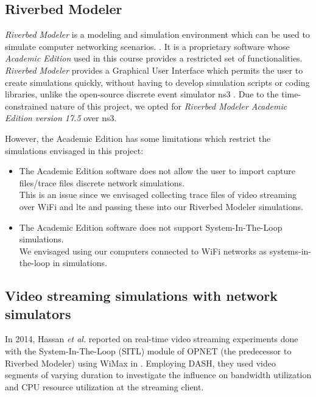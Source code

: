 \subsection{Riverbed Modeler} \label{subsec:background:riverbed}
\textit{Riverbed Modeler} is a modeling and simulation environment which can be used to simulate computer networking scenarios. \cite{riverbed}. It is a proprietary software whose \textit{Academic Edition} used in this course provides a restricted set of functionalities. \textit{Riverbed Modeler} provides a Graphical User Interface which permits the user to create simulations quickly, without having to develop simulation scripts or coding libraries, unlike the open-source discrete event simulator \gls{ns3} \cite{nsnamwiki}. Due to the time-constrained nature of this project, we opted for \textit{Riverbed Modeler Academic Edition version 17.5} over \gls{ns3}.

However, the Academic Edition has some limitations \cite{riverbedrestrictions} which restrict the simulations envisaged in this project:
\begin{itemize}
	\item The Academic Edition software does not allow the user to import capture files/trace files discrete network simulations.\\ This is an issue since we envisaged collecting trace files of video streaming over \gls{WiFi} and \gls{lte} and passing these into our Riverbed Modeler simulations.
	\item The Academic Edition software does not support System-In-The-Loop simulations.\\
	We envisaged using our computers connected to \gls{WiFi} networks as systems-in-the-loop in simulations.
\end{itemize}


\subsection{Video streaming simulations with network simulators} \label{subsec:background:simu}
In 2014, Hassan \textit{et al.} reported on real-time video streaming experiments done with the System-In-The-Loop (SITL) module of \gls{OPNET} (the predecessor to Riverbed Modeler) using WiMax in \cite{7016825}. Employing \gls{DASH}, they used video segments of varying duration to investigate the influence on bandwidth utilization and CPU resource utilization at the streaming client.

